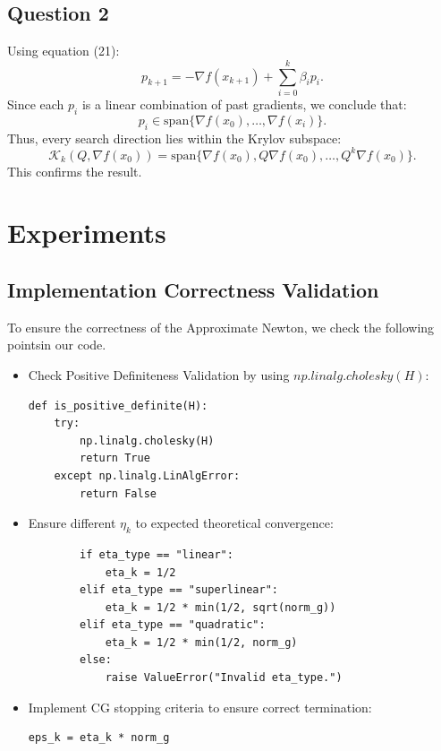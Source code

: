 \documentclass[12pt]{article}
\begin{document}
\subsection{Question 2}

Using equation (21):
\[
p_{k+1} = -\nabla f(x_{k+1}) + \sum_{i=0}^{k} \beta_i p_i.
\]
Since each $p_i$ is a linear combination of past gradients, we conclude that:
\[
p_i \in \text{span}\{ \nabla f(x_0), \dots, \nabla f(x_i) \}.
\]
Thus, every search direction lies within the Krylov subspace:
\[
\mathcal{K}_k(Q, \nabla f(x_0)) = \text{span}\{ \nabla f(x_0), Q \nabla f(x_0), \dots, Q^k \nabla f(x_0) \}.
\]
This confirms the result.

\section{Experiments}

\subsection{Implementation Correctness Validation}

To ensure the correctness of the Approximate Newton, we check the following pointsin our code.

\begin{itemize}
    \item Check Positive Definiteness Validation by using $np.linalg.cholesky(H)$:
\begin{lstlisting}
def is_positive_definite(H):
    try:
        np.linalg.cholesky(H)
        return True
    except np.linalg.LinAlgError:
        return False
\end{lstlisting}
    \item Ensure different $\eta_k$ to expected theoretical convergence:
\begin{lstlisting}
        if eta_type == "linear":
            eta_k = 1/2 
        elif eta_type == "superlinear":
            eta_k = 1/2 * min(1/2, sqrt(norm_g))
        elif eta_type == "quadratic":
            eta_k = 1/2 * min(1/2, norm_g)
        else:
            raise ValueError("Invalid eta_type.")
\end{lstlisting}
    \item Implement CG stopping criteria to ensure correct termination:
\begin{lstlisting}
eps_k = eta_k * norm_g
\end{lstlisting}
\end{itemize}
\end{document}
